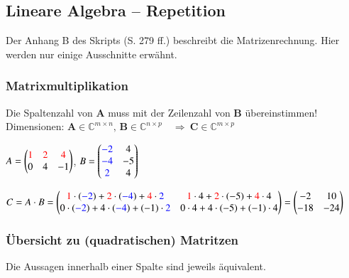 \subsection{Lineare Algebra -- Repetition}

Der Anhang B des Skripts (S. 279 ff.) beschreibt die Matrizenrechnung. Hier werden nur einige Ausschnitte erwähnt.


\subsubsection{Matrixmultiplikation}

Die Spaltenzahl von $\bm{A}$ muss mit der Zeilenzahl von $\bm{B}$ übereinstimmen! \\
Dimensionen: $\bm{A} \in \mathbb{C}^{m \times n}, \, \bm{B} \in \mathbb{C}^{n \times p} \quad \Rightarrow\ \bm{C} \in \mathbb{C}^{m \times p}$


$A =
	\begin{pmatrix}
		{\color{red}1} & {\color{red}2}   & {\color{red}4}   \\
		0       & 4         & -1
	\end{pmatrix}$, \qquad 
$B =
	\begin{pmatrix}
		{\color{blue}-2}    & 4     \\
		{\color{blue}-4}    & -5    \\
		{\color{blue}2}     & 4
	\end{pmatrix}$
	
\smallskip

$C = A \cdot B =
	\begin{pmatrix}
		{\color{red}1} \cdot ({{\color{blue}-2}}) + {{\color{red}2}} \cdot ({{\color{blue}-4}}) + {\color{red}4} \cdot {\color{blue}2}   &
		{\color{red}1} \cdot 4 + {\color{red}2} \cdot (-5) + {\color{red}4} \cdot 4                              \\
		0 \cdot ({{\color{blue}-2}}) + 4 \cdot ({\color{blue}-4}) + (-1) \cdot {\color{blue}2}                      &
		0 \cdot 4 + 4 \cdot (-5) + (-1) \cdot 4
	\end{pmatrix}
    = 
    \begin{pmatrix}
		-2  & 10    \\
        -18 & -24
	\end{pmatrix}$


\subsubsection{Übersicht zu (quadratischen) Matritzen}

Die Aussagen innerhalb einer Spalte sind jeweils äquivalent.

